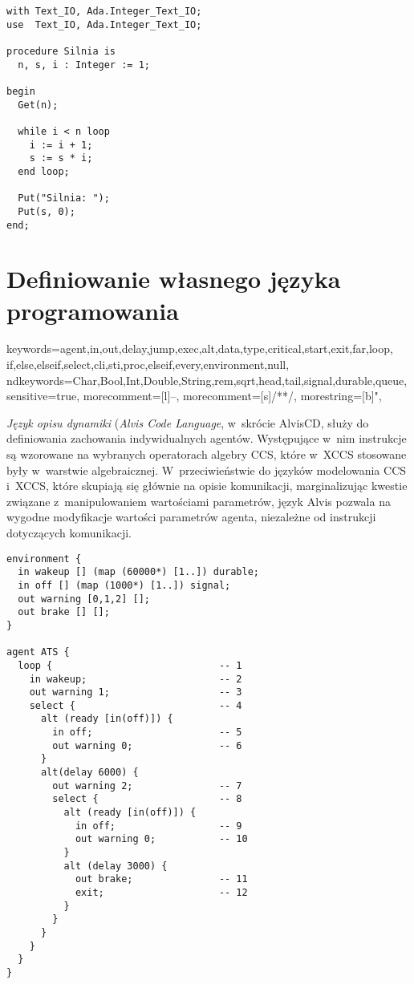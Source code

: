 \documentclass[a4paper,11pt]{article}
\begin{document}
\begin{lstlisting}
with Text_IO, Ada.Integer_Text_IO; 
use  Text_IO, Ada.Integer_Text_IO; 

procedure Silnia is 
  n, s, i : Integer := 1;

begin  
  Get(n);  

  while i < n loop
    i := i + 1;
    s := s * i;
  end loop;  

  Put("Silnia: "); 
  Put(s, 0);
end;
\end{lstlisting}

\newpage

\section{Definiowanie własnego języka programowania}


{
keywords={agent,in,out,delay,jump,exec,alt,data,type,critical,start,exit,far,loop,
if,else,elseif,select,cli,sti,proc,elseif,every,environment,null},
ndkeywords={Char,Bool,Int,Double,String,rem,sqrt,head,tail,signal,durable,queue},
sensitive=true,
morecomment=[l]{--},
morecomment=[s]{/*}{*/},
morestring=[b]",
}


\emph{Język opisu dynamiki} (\emph{Alvis Code Language}, w~skrócie AlvisCD, służy do definiowania zachowania indywidualnych agentów. Występujące w~nim instrukcje są wzorowane na wybranych operatorach algebry CCS, które w~XCCS stosowane były w~warstwie algebraicznej. W~przeciwieństwie do języków modelowania CCS i~XCCS, które skupiają się głównie na opisie komunikacji, marginalizując kwestie związane z~manipulowaniem wartościami parametrów, język Alvis pozwala na wygodne modyfikacje wartości parametrów agenta, niezależne od instrukcji dotyczących komunikacji. 

\begin{lstlisting}
environment {
  in wakeup [] (map (60000*) [1..]) durable;
  in off [] (map (1000*) [1..]) signal;
  out warning [0,1,2] [];
  out brake [] [];  
}

agent ATS {
  loop {                             -- 1
    in wakeup;                       -- 2
    out warning 1;                   -- 3
    select {                         -- 4
      alt (ready [in(off)]) {
        in off;                      -- 5
        out warning 0;               -- 6
      }
      alt(delay 6000) {
        out warning 2;               -- 7
        select {                     -- 8
          alt (ready [in(off)]) {
            in off;                  -- 9
            out warning 0;           -- 10
          }
          alt (delay 3000) {
            out brake;               -- 11
            exit;                    -- 12
          } 
        } 
      } 
    } 
  } 
}
\end{lstlisting}
\end{document}
